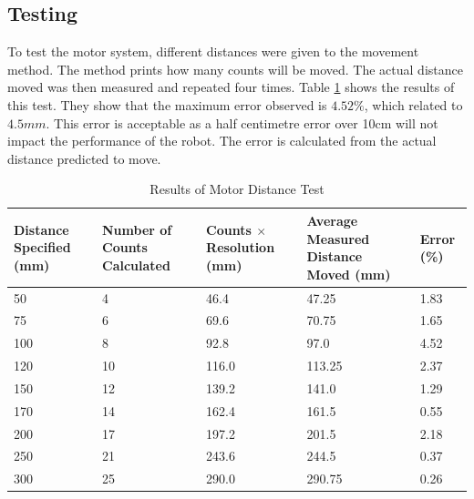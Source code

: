 \subsection{Testing}\label{Section:MotorTest}

To test the motor system, different distances were given to the movement method. The method prints how many counts will be moved. The actual distance moved was then measured and repeated four times. Table \ref{table:results:motor:distance} shows the results of this test. They show that the maximum error observed is $4.52\%$, which related to $4.5mm$. This error is acceptable as a half centimetre error over 10cm will not impact the performance of the robot. The error is calculated from the actual distance predicted to move. 


\begin{table}
\caption{Results of Motor Distance Test}
\label{table:results:motor:distance}
\begin{tabular}{|p{2.5cm}|p{2.5cm}|p{2.5cm}|p{2.5cm}|p{2.5cm}|} \hline
Distance Specified (mm) &	Number of Counts Calculated	& 	Counts $\times$ Resolution (mm)	& 	Average Measured Distance Moved (mm)	&	Error (\%) \\ \hline
50						&	4							&	46.4							&	47.25									&	1.83		\\
75						&	6							&	69.6							&	70.75									&	1.65		\\
100						&	8							&	92.8							&	97.0									&	4.52		\\
120						&	10							&	116.0							&	113.25									&	2.37		\\
150						&	12							&	139.2							&	141.0									&	1.29		\\
170						&	14							&	162.4							&	161.5									&	0.55		\\
200						&	17							&	197.2							&	201.5									&	2.18		\\
250						&	21							&	243.6							&	244.5									&	0.37		\\
300						&	25							&	290.0							&	290.75									&	0.26		\\ \hline
\end{tabular}
\end{table}


